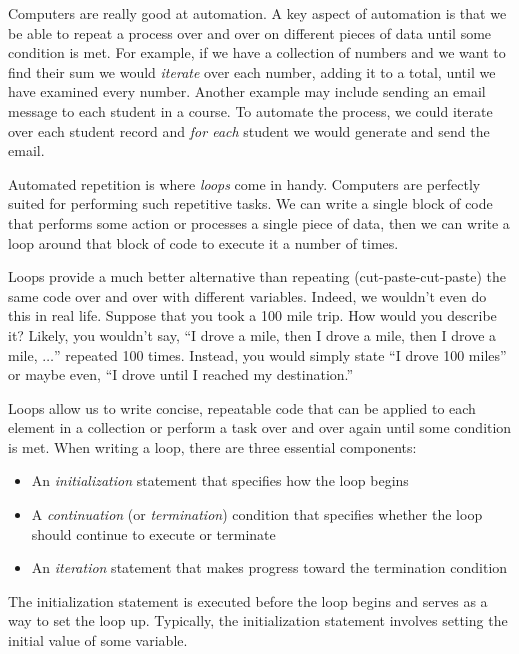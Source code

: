 

Computers are really good at automation.  A key aspect of automation is that we be
able to repeat a process over and over on different pieces of data until some condition
is met.  For example, if we have a collection of numbers and we want to find their
sum we would \emph{iterate} over each number, adding it to a total, until we have
examined every number.  Another example may include sending an email message
to each student in a course.  To automate the process, we could iterate over each
student record and \emph{for each} student we would generate and send the email.

Automated repetition is where \emph{loops} come in handy.  Computers are perfectly suited 
for performing such repetitive tasks.  We can write a single block of code that performs
some action or processes a single piece of data, then we can write a loop around that
block of code to execute it a number of times.

Loops provide a much better alternative than repeating (cut-paste-cut-paste) the same
code over and over with different variables.  Indeed, we wouldn't even do this in real life.
Suppose that you took a 100 mile trip.  How would you describe it?  Likely,
you wouldn't say, ``I drove a mile, then I drove a mile, then I drove a mile, $\ldots$'' repeated
100 times.  Instead, you would simply state ``I drove 100 miles'' or maybe even, ``I drove
until I reached my destination.''  

Loops allow us to write concise, repeatable code that can be applied to each element in 
a collection or perform a task over and over again until some condition is met.  When 
writing a loop, there are three essential components:

\begin{itemize}
  \item An \emph{initialization} statement that specifies how the loop begins
  \item A \emph{continuation} (or \emph{termination}) condition that specifies whether the loop 
  	should continue to execute or terminate
  \item An \emph{iteration} statement that makes progress toward the termination condition
\end{itemize}

The initialization statement is executed before the loop begins and serves as a way
to set the loop up.  Typically, the initialization statement involves setting the initial value 
of some variable.

